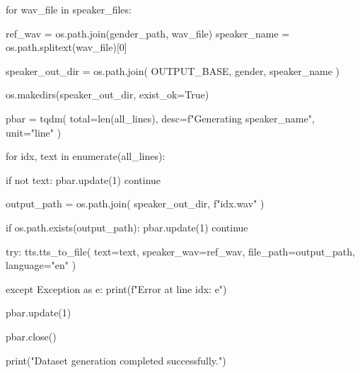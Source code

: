 \begin{tcblisting}
    for wav_file in speaker_files:

        ref_wav = os.path.join(gender_path, wav_file)
        speaker_name = os.path.splitext(wav_file)[0]

        speaker_out_dir = os.path.join(
            OUTPUT_BASE,
            gender,
            speaker_name
        )

        os.makedirs(speaker_out_dir, exist_ok=True)

        pbar = tqdm(
            total=len(all_lines),
            desc=f"Generating {speaker_name}",
            unit="line"
        )

        for idx, text in enumerate(all_lines):

            if not text:
                pbar.update(1)
                continue

            output_path = os.path.join(
                speaker_out_dir,
                f"{idx}.wav"
            )

            if os.path.exists(output_path):
                pbar.update(1)
                continue

            try:
                tts.tts_to_file(
                    text=text,
                    speaker_wav=ref_wav,
                    file_path=output_path,
                    language="en"
                )

            except Exception as e:
                print(f"Error at line {idx}: {e}")

            pbar.update(1)

        pbar.close()

print("Dataset generation completed successfully.")

\end{tcblisting}